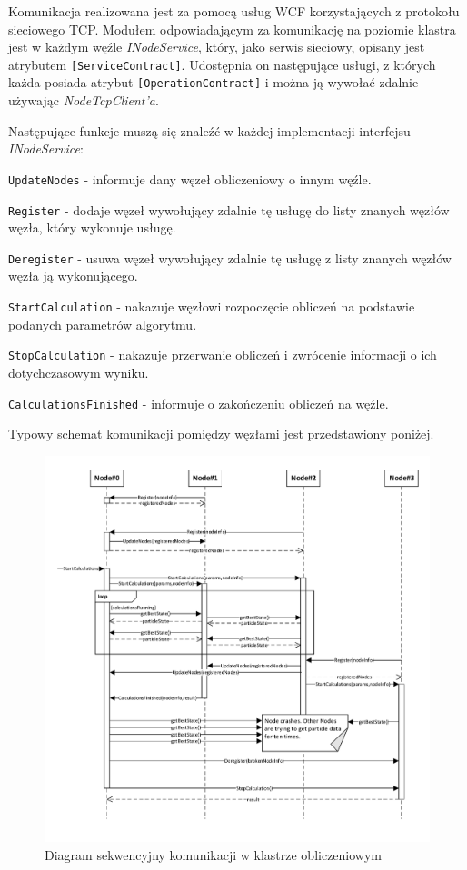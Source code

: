 \documentclass[12pt, twoside, openany, abstract=on]{report}
\theoremstyle{definition}
\begin{document}
Komunikacja realizowana jest za pomocą usług WCF korzystających z protokołu sieciowego TCP. Modułem odpowiadającym za komunikację na poziomie klastra jest w każdym węźle \textit{INodeService}, który, jako serwis sieciowy, opisany jest atrybutem \texttt{[ServiceContract]}. Udostępnia on następujące usługi, z których każda posiada atrybut \texttt{[OperationContract]} i można ją wywołać zdalnie używając \textit{NodeTcpClient'a}.

Następujące funkcje muszą się znaleźć w każdej implementacji interfejsu \textit{INodeService}:

\texttt{UpdateNodes} - informuje dany węzeł obliczeniowy o innym węźle.

\texttt{Register} - dodaje węzeł wywołujący zdalnie tę usługę do listy znanych węzłów węzła, który wykonuje usługę.

\texttt{Deregister} - usuwa węzeł wywołujący zdalnie tę usługę z listy znanych węzłów węzła ją wykonującego.

\texttt{StartCalculation} - nakazuje węzłowi rozpoczęcie obliczeń na podstawie podanych parametrów algorytmu.

\texttt{StopCalculation} - nakazuje przerwanie obliczeń i zwrócenie informacji o ich dotychczasowym wyniku.

\texttt{CalculationsFinished} - informuje o zakończeniu obliczeń na węźle.

Typowy schemat komunikacji pomiędzy węzłami jest przedstawiony poniżej.

\begin{figure}[H]
    \centering
    \includegraphics[scale=0.8]{communicationDiagram.pdf} 
 \caption{Diagram sekwencyjny komunikacji w klastrze obliczeniowym}
\end{figure}
\end{document}
